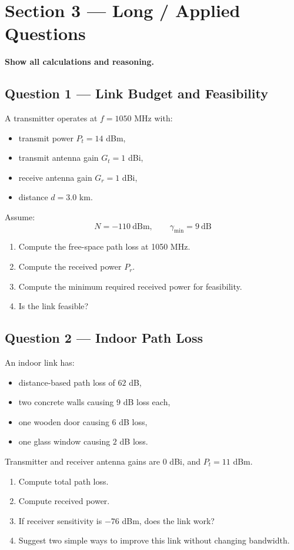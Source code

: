 \documentclass[11pt,a4paper]{article}
\begin{document}
\newpage
\section*{Section 3 --- Long / Applied Questions}
\textbf{Show all calculations and reasoning.}

\subsection*{Question 1 --- Link Budget and Feasibility}
A transmitter operates at $f = 1050$ MHz with:
\begin{itemize}[leftmargin=1.2cm]
    \item transmit power $P_t = 14$ dBm,
    \item transmit antenna gain $G_t = 1$ dBi,
    \item receive antenna gain $G_r = 1$ dBi,
    \item distance $d = 3.0$ km.
\end{itemize}

Assume:
\[
N = -110\ \mathrm{dBm}, \qquad \gamma_{\min} = 9\ \mathrm{dB}
\]

\begin{enumerate}[label=\alph*)]
    \item Compute the free-space path loss at 1050 MHz.
    \item Compute the received power $P_r$.
    \item Compute the minimum required received power for feasibility.
    \item Is the link feasible?
\end{enumerate}

\subsection*{Question 2 --- Indoor Path Loss}
An indoor link has:
\begin{itemize}[leftmargin=1.2cm]
    \item distance-based path loss of $62$ dB,
    \item two concrete walls causing $9$ dB loss each,
    \item one wooden door causing $6$ dB loss,
    \item one glass window causing $2$ dB loss.
    \end{itemize}

Transmitter and receiver antenna gains are $0$ dBi, and $P_t = 11$ dBm.

\begin{enumerate}[label=\alph*)]
    \item Compute total path loss.
    \item Compute received power.
    \item If receiver sensitivity is $-76$ dBm, does the link work?
    \item Suggest two simple ways to improve this link without changing bandwidth.
\end{enumerate}
\end{document}
